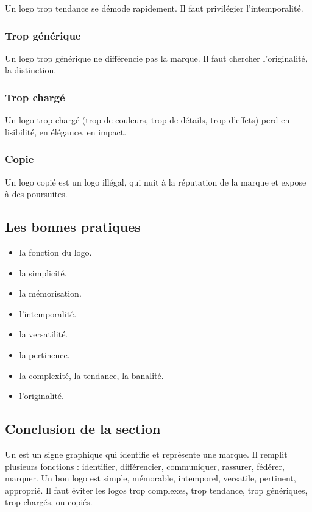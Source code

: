 Un logo trop tendance se démode rapidement. Il faut privilégier l'intemporalité.

\subsubsection{Trop générique}

Un logo trop générique ne différencie pas la marque. Il faut chercher l'originalité, la distinction.

\subsubsection{Trop chargé}

Un logo trop chargé (trop de couleurs, trop de détails, trop d'effets) perd en lisibilité, en élégance, en impact.

\subsubsection{Copie}

Un logo copié est un logo illégal, qui nuit à la réputation de la marque et expose à des poursuites.

\subsection{Les bonnes pratiques}

\begin{itemize}
    \item {} la fonction du logo.
    \item {} la simplicité.
    \item {} la mémorisation.
    \item {} l'intemporalité.
    \item {} la versatilité.
    \item {} la pertinence.
    \item {} la complexité, la tendance, la banalité.
    \item {} l'originalité.
\end{itemize}

\subsection*{Conclusion de la section}

Un  est un signe graphique qui identifie et représente une marque. Il remplit plusieurs fonctions : identifier, différencier, communiquer, rassurer, fédérer, marquer. Un bon logo est simple, mémorable, intemporel, versatile, pertinent, approprié. Il faut éviter les logos trop complexes, trop tendance, trop génériques, trop chargés, ou copiés.

